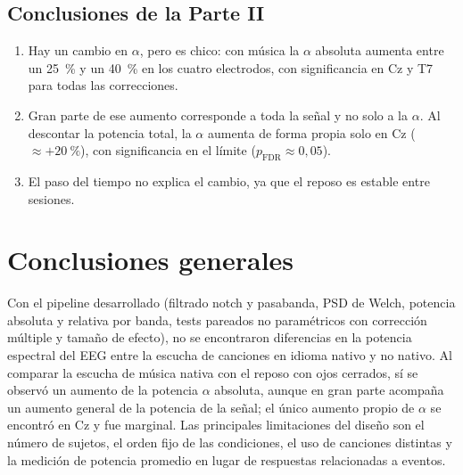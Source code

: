\documentclass[11pt,a4paper]{article}
\begin{document}
\subsection{Conclusiones de la Parte II}
\begin{enumerate}
  \item Hay un cambio en $\alpha$, pero es chico: con música la $\alpha$ absoluta aumenta entre un 25~\% y un 40~\% en los cuatro electrodos, con significancia en Cz y T7 para todas las correcciones.
  \item Gran parte de ese aumento corresponde a toda la señal y no solo a la $\alpha$. Al descontar la potencia total, la $\alpha$ aumenta de forma propia solo en Cz ($\approx +20~\%$), con significancia en el límite ($p_{\text{FDR}} \approx 0{,}05$).
  \item El paso del tiempo no explica el cambio, ya que el reposo es estable entre sesiones.
\end{enumerate}

\section{Conclusiones generales}
Con el pipeline desarrollado (filtrado notch y pasabanda, PSD de Welch, potencia absoluta y relativa por banda, tests pareados no paramétricos con corrección múltiple y tamaño de efecto), no se encontraron diferencias en la potencia espectral del EEG entre la escucha de canciones en idioma nativo y no nativo. Al comparar la escucha de música nativa con el reposo con ojos cerrados, sí se observó un aumento de la potencia $\alpha$ absoluta, aunque en gran parte acompaña un aumento general de la potencia de la señal; el único aumento propio de $\alpha$ se encontró en Cz y fue marginal. Las principales limitaciones del diseño son el número de sujetos, el orden fijo de las condiciones, el uso de canciones distintas y la medición de potencia promedio en lugar de respuestas relacionadas a eventos.
\end{document}
